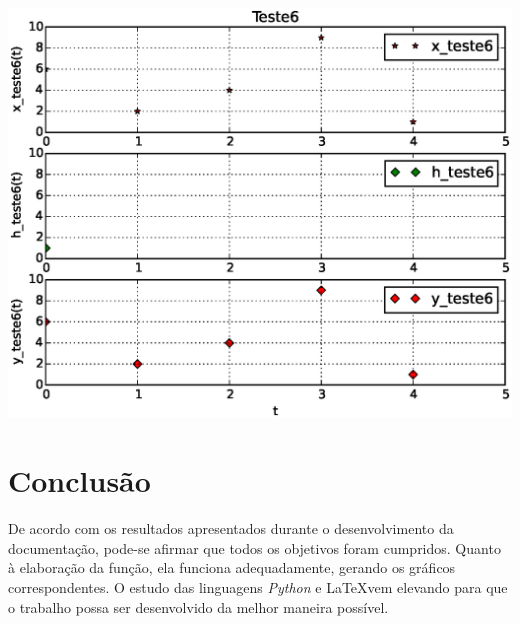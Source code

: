 \documentclass[dvipdfm, a4paper, 11pt]{report}
\begin{document}
{\includegraphics[scale = 0.5]{Teste6.eps}\\
\chapter{Conclusão}\label{conc}
De acordo com os resultados apresentados durante o desenvolvimento da documentação, pode-se afirmar que todos os objetivos foram cumpridos.
Quanto à elaboração da função, ela funciona adequadamente, gerando os gráficos correspondentes. O estudo das linguagens \emph{Python} e \LaTeX vem elevando para que o trabalho possa ser desenvolvido da melhor maneira possível.

}
\end{document}

